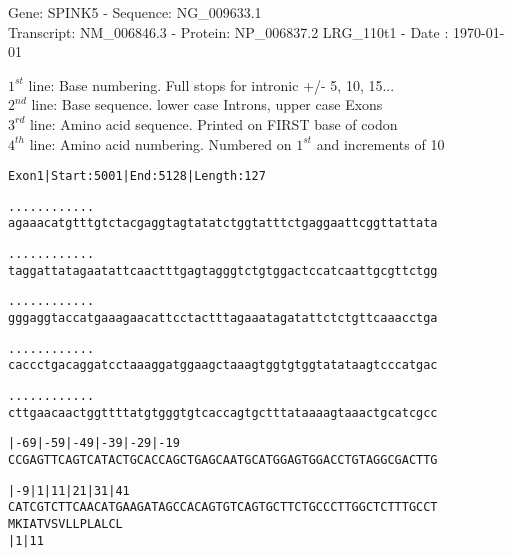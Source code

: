 \documentclass{article}
\begin{document}
\begin{center}
\begin{large}
Gene: SPINK5 - Sequence: NG\_009633.1\\
Transcript: NM\_006846.3 - Protein: NP\_006837.2
LRG\_110t1 - Date : \today
\end{large}
\end{center}
$1^{st}$ line: Base numbering. Full stops for intronic +/- 5, 10, 15...\\
$2^{nd}$ line: Base sequence. lower case Introns, upper case Exons\\
$3^{rd}$ line: Amino acid sequence. Printed on FIRST base of codon\\
$4^{th}$ line: Amino acid numbering. Numbered on $1^{st}$ and increments of 10\\
\begin{alltt}
Exon 1 | Start: 5001 | End: 5128 | Length: 127

.    .    .    .    .    .    .    .    .    .    .    .
agaaacatgtttgtctacgaggtagtatatctggtatttctgaggaattcggttattata



.    .    .    .    .    .    .    .    .    .    .    .
taggattatagaatattcaactttgagtagggtctgtggactccatcaattgcgttctgg



.    .    .    .    .    .    .    .    .    .    .    .
gggaggtaccatgaaagaacattcctactttagaaatagatattctctgttcaaacctga



.    .    .    .    .    .    .    .    .    .    .    .
caccctgacaggatcctaaaggatggaagctaaagtggtgtggtatataagtcccatgac



.    .    .    .    .    .    .    .    .    .    .    .
cttgaacaactggttttatgtgggtgtcaccagtgctttataaaagtaaactgcatcgcc



    |-69      |-59      |-49      |-39      |-29      |-19
CCGAGTTCAGTCATACTGCACCAGCTGAGCAATGCATGGAGTGGACCTGTAGGCGACTTG



    |-9      |1        |11       |21       |31       |41
CATCGTCTTCAACATGAAGATAGCCACAGTGTCAGTGCTTCTGCCCTTGGCTCTTTGCCT
             M  K  I  A  T  V  S  V  L  L  P  L  A  L  C  L
             |1                            |11

\end{alltt}
\newpage
\end{document}
